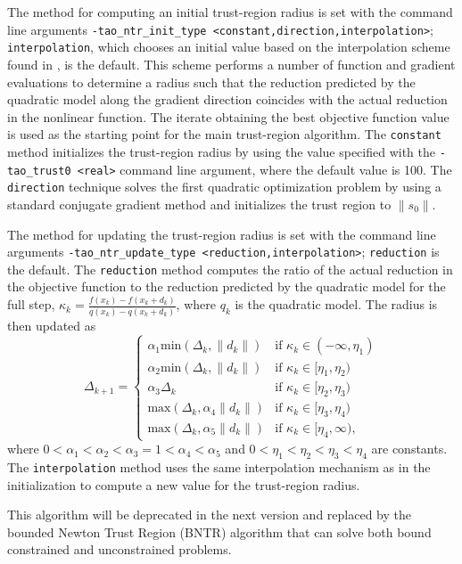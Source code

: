 The method for computing an initial trust-region radius is set with the 
command line arguments {\tt -tao\_ntr\_init\_type <constant,direction,interpolation>};
{\tt interpolation}, which chooses an initial value based on the 
interpolation scheme found in \cite{CGT}, is the default.  This
scheme performs a number of function and gradient evaluations to determine 
a radius such that the reduction predicted by the quadratic model along the 
gradient direction coincides with the actual reduction in the nonlinear 
function.  The iterate obtaining the best objective function value is 
used as the starting point for the main trust-region algorithm.  The 
{\tt constant} method initializes the trust-region radius by using 
the value specified with the {\tt -tao\_trust0 <real>} command line 
argument, where the default value is 100.  The {\tt direction} technique 
solves the first quadratic optimization problem by using a standard 
conjugate gradient method and initializes the trust region to 
$\|s_0\|$.

The method for updating the trust-region radius is set with the 
command line arguments 
{\tt -tao\_ntr\_update\_type <reduction,interpolation>}; {\tt reduction} 
is the default.  The {\tt reduction} method computes the ratio of the 
actual reduction in the objective function to the reduction predicted 
by the quadratic model for the full step, 
$\kappa_k = \frac{f(x_k) - f(x_k + d_k)}{q(x_k) - q(x_k + d_k)}$, where 
$q_k$ is the quadratic model.  The radius is then updated as
\[
\Delta_{k+1} = \left\{\begin{array}{ll}
\alpha_1 \mbox{min}(\Delta_k, \|d_k\|) & \mbox{if } \kappa_k \in (-\infty, \eta_1) \\
\alpha_2 \mbox{min}(\Delta_k, \|d_k\|) & \mbox{if } \kappa_k \in [\eta_1, \eta_2) \\
\alpha_3 \Delta_k & \mbox{if } \kappa_k \in [\eta_2, \eta_3) \\
\mbox{max}(\Delta_k, \alpha_4 \|d_k\|) & \mbox{if } \kappa_k \in [\eta_3, \eta_4) \\
\mbox{max}(\Delta_k, \alpha_5 \|d_k\|) & \mbox{if } \kappa_k \in [\eta_4, \infty),
\end{array}
\right.
\]
where $0 < \alpha_1 < \alpha_2 < \alpha_3 = 1 < \alpha_4 < \alpha_5$ and
$0 < \eta_1 < \eta_2 < \eta_3 < \eta_4$ are constants.  The {\tt interpolation}
method uses the same interpolation mechanism as in the initialization to
compute a new value for the trust-region radius.

This algorithm will be deprecated in the next version and replaced by the 
bounded Newton Trust Region (BNTR) algorithm that can solve both bound constrained 
and unconstrained problems.

